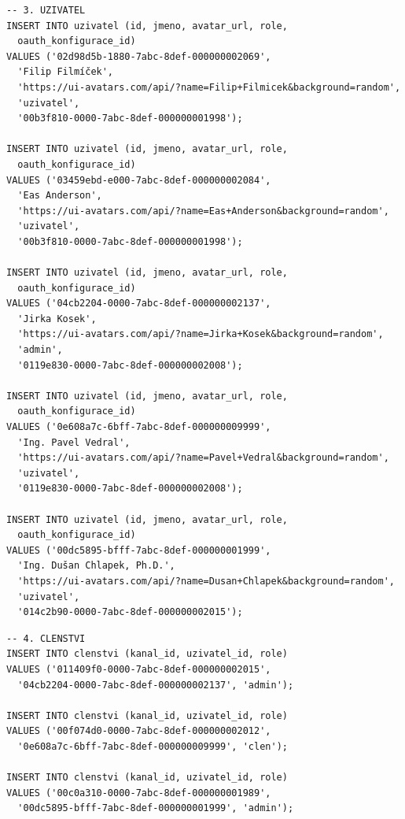 \documentclass[12pt,a4paper]{article}
\begin{document}
\begin{lstlisting}
-- 3. UZIVATEL
INSERT INTO uzivatel (id, jmeno, avatar_url, role,
  oauth_konfigurace_id)
VALUES ('02d98d5b-1880-7abc-8def-000000002069',
  'Filip Filmíček',
  'https://ui-avatars.com/api/?name=Filip+Filmicek&background=random',
  'uzivatel',
  '00b3f810-0000-7abc-8def-000000001998');

INSERT INTO uzivatel (id, jmeno, avatar_url, role,
  oauth_konfigurace_id)
VALUES ('03459ebd-e000-7abc-8def-000000002084',
  'Eas Anderson',
  'https://ui-avatars.com/api/?name=Eas+Anderson&background=random',
  'uzivatel',
  '00b3f810-0000-7abc-8def-000000001998');

INSERT INTO uzivatel (id, jmeno, avatar_url, role,
  oauth_konfigurace_id)
VALUES ('04cb2204-0000-7abc-8def-000000002137',
  'Jirka Kosek',
  'https://ui-avatars.com/api/?name=Jirka+Kosek&background=random',
  'admin',
  '0119e830-0000-7abc-8def-000000002008');

INSERT INTO uzivatel (id, jmeno, avatar_url, role,
  oauth_konfigurace_id)
VALUES ('0e608a7c-6bff-7abc-8def-000000009999',
  'Ing. Pavel Vedral',
  'https://ui-avatars.com/api/?name=Pavel+Vedral&background=random',
  'uzivatel',
  '0119e830-0000-7abc-8def-000000002008');

INSERT INTO uzivatel (id, jmeno, avatar_url, role,
  oauth_konfigurace_id)
VALUES ('00dc5895-bfff-7abc-8def-000000001999',
  'Ing. Dušan Chlapek, Ph.D.',
  'https://ui-avatars.com/api/?name=Dusan+Chlapek&background=random',
  'uzivatel',
  '014c2b90-0000-7abc-8def-000000002015');
\end{lstlisting}

\begin{lstlisting}
-- 4. CLENSTVI
INSERT INTO clenstvi (kanal_id, uzivatel_id, role)
VALUES ('011409f0-0000-7abc-8def-000000002015',
  '04cb2204-0000-7abc-8def-000000002137', 'admin');

INSERT INTO clenstvi (kanal_id, uzivatel_id, role)
VALUES ('00f074d0-0000-7abc-8def-000000002012',
  '0e608a7c-6bff-7abc-8def-000000009999', 'clen');

INSERT INTO clenstvi (kanal_id, uzivatel_id, role)
VALUES ('00c0a310-0000-7abc-8def-000000001989',
  '00dc5895-bfff-7abc-8def-000000001999', 'admin');
\end{lstlisting}
\end{document}
